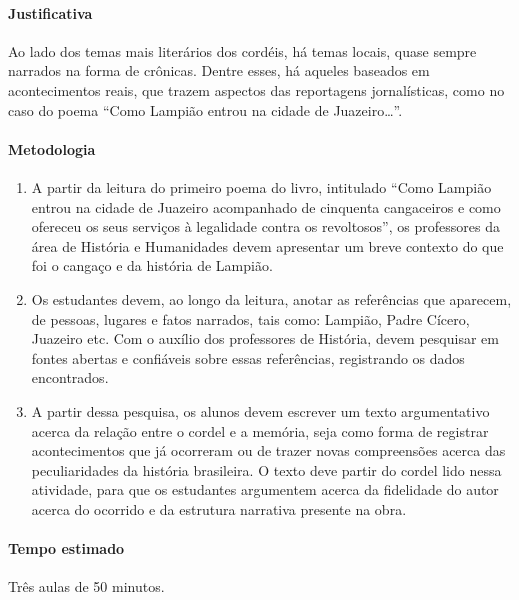 \documentclass[12pt]{extarticle}
\begin{document}
\paragraph{Justificativa} Ao lado dos temas mais literários dos cordéis, há
temas locais, quase sempre narrados na forma de crônicas. Dentre esses, há
aqueles baseados em acontecimentos reais, que trazem aspectos das reportagens
jornalísticas, como no caso do poema ``Como Lampião entrou na cidade de
Juazeiro{}\dots{}''.

\paragraph{Metodologia}

\begin{enumerate}

\item A partir da leitura do primeiro poema do livro, intitulado ``Como Lampião
  entrou na cidade de Juazeiro acompanhado de cinquenta cangaceiros e como
  ofereceu os seus serviços à legalidade contra os revoltosos'', os professores
  da área de História e Humanidades devem apresentar um breve contexto do que
  foi o cangaço e da história de Lampião.

\item Os estudantes devem, ao longo da leitura, anotar as referências que
  aparecem, de pessoas, lugares e fatos narrados, tais como: Lampião, Padre
  Cícero, Juazeiro etc. Com o auxílio dos professores de História, devem
  pesquisar em fontes abertas e confiáveis sobre essas referências, registrando
  os dados encontrados.

\item A partir dessa pesquisa, os alunos devem escrever um texto argumentativo
  acerca da relação entre o cordel e a memória, seja como forma de registrar
  acontecimentos que já ocorreram ou de trazer novas compreensões acerca das
  peculiaridades da história brasileira. O texto deve partir do cordel lido
  nessa atividade, para que os estudantes argumentem acerca da fidelidade do
  autor acerca do ocorrido e da estrutura narrativa presente na obra.

\end{enumerate}

\paragraph{Tempo estimado} Três aulas de 50 minutos.
\end{document}

